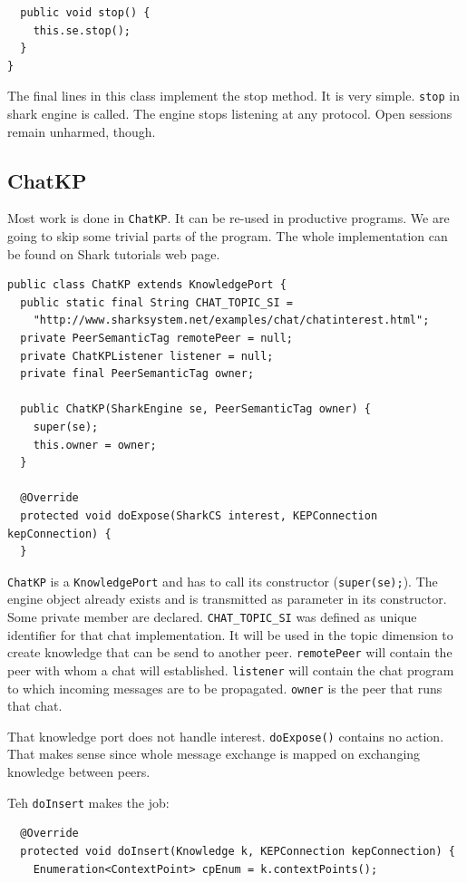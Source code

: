 {\begin{verbatim}
  public void stop() {
    this.se.stop();
  }
}
\end{verbatim}
The final lines in this class implement the stop method. It is very simple. {\tt stop} in shark engine is called. The engine stops listening at any protocol. Open sessions remain unharmed, though.

\subsection{ChatKP}
Most work is done in {\tt ChatKP}. It can be re-used in productive programs.
We are going to skip some trivial parts of the program. The whole implementation can be found on Shark tutorials web page.

\begin{verbatim}
public class ChatKP extends KnowledgePort {
  public static final String CHAT_TOPIC_SI =
    "http://www.sharksystem.net/examples/chat/chatinterest.html";
  private PeerSemanticTag remotePeer = null;
  private ChatKPListener listener = null;
  private final PeerSemanticTag owner;

  public ChatKP(SharkEngine se, PeerSemanticTag owner) {
    super(se);
    this.owner = owner;
  }

  @Override
  protected void doExpose(SharkCS interest, KEPConnection kepConnection) {
  }
\end{verbatim}

{\tt ChatKP} is a {\tt KnowledgePort} and has to call its constructor
({\tt super(se);}). The engine object already exists and is transmitted as
parameter in its constructor. Some private member are declared. 
{\tt CHAT\_TOPIC\_SI} was defined as unique identifier for that chat implementation. It will be used in the topic dimension to create knowledge that can be send to another peer. {\tt remotePeer} will contain the peer with whom a chat will established. {\tt listener} will contain the chat program to which incoming messages are to be propagated. {\tt owner} is the peer that runs that chat.

That knowledge port does not handle interest. {\tt doExpose()} contains no action. That makes sense since whole message exchange is mapped on exchanging knowledge between peers.

Teh {\tt doInsert} makes the job:
\begin{verbatim}
  @Override
  protected void doInsert(Knowledge k, KEPConnection kepConnection) {
    Enumeration<ContextPoint> cpEnum = k.contextPoints();


\end{verbatim}}
